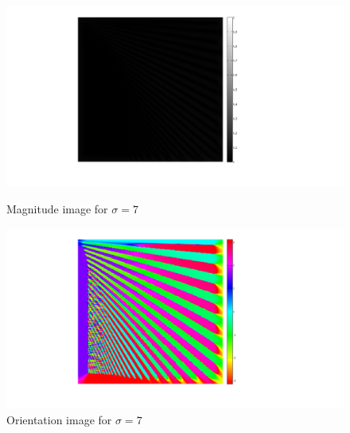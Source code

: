 \documentclass[a4paper,10pt]{article}
\begin{document}
\begin{figure}[ht]
\begin{minipage}[b]{0.45\linewidth}
\centering
\includegraphics[width=\textwidth]{pn1_img/magnitude_sigma7}
\caption{Magnitude image for $\sigma=7$}
\end{minipage}
\hspace{0.1cm}
\begin{minipage}[b]{0.45\linewidth}
\centering
\includegraphics[width=\textwidth]{pn1_img/orientation_sigma7}
\caption{Orientation image for $\sigma=7$}
\end{minipage}
\end{figure}
\end{document}
